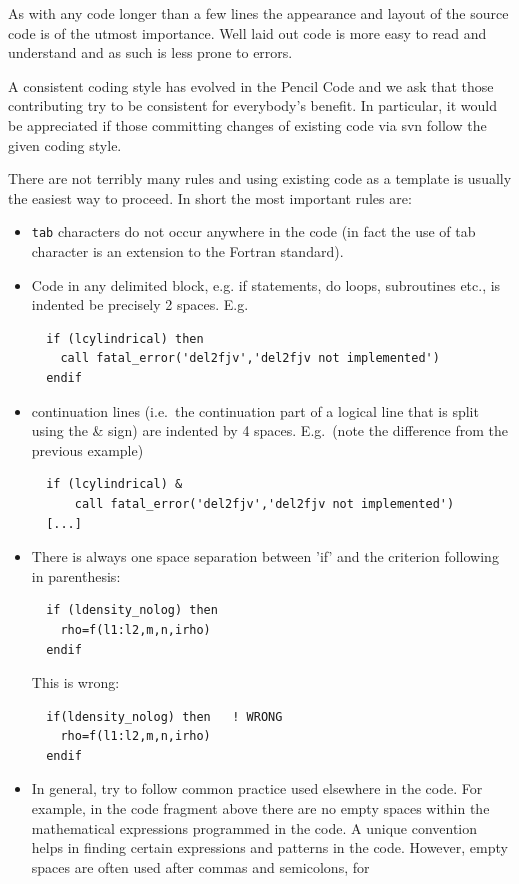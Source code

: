 \documentclass[\mydriver,12pt,twoside,notitlepage,a4paper]{article}
\makeatletter
\newcommand{\code}[1]{\texttt{#1}}
\newcommand{\cmd}{\command}
\newcommand{\command}[2][]{%
  \def\index@{#1}%
  \code{#2}%
  \ifx\index@\@empty\index{#2@\emph{#2}}%
  \else\index{#1@\emph{#1}}%
  \fi%
}
\makeatother
\begin{document}
As with any code longer than a few lines the appearance and layout
of the source code is of the utmost importance.  Well laid out
code is more easy to read and understand and as such is less prone
to errors.

A consistent coding style has evolved in the {\sc Pencil Code} and we
ask that those contributing try to be consistent for everybody's
benefit.  In particular, it would be appreciated if those committing
changes of existing code via svn follow the given coding style.

There are not terribly many rules and using existing code as a template
is usually the easiest way to proceed.  In short the most important rules are:
\begin{itemize}
\item \cmd{tab} characters do not occur anywhere in the code (in fact the use of
tab character is an extension to the Fortran standard).
\item Code in any delimited block, e.g. if statements, do loops, subroutines
etc., is indented be precisely 2 spaces.
E.g.
\begin{Verbatim}
  if (lcylindrical) then
    call fatal_error('del2fjv','del2fjv not implemented')
  endif
\end{Verbatim}
\item continuation lines (i.e.~the continuation part of a logical line
  that is split using the \& sign) are indented by 4 spaces.
  E.g.~(note the difference from the previous example)
\begin{Verbatim}
  if (lcylindrical) &
      call fatal_error('del2fjv','del2fjv not implemented')
  [...]
\end{Verbatim}
\item There is always one space separation between 'if' and the criterion
following in parenthesis:
\begin{verbatim}
  if (ldensity_nolog) then
    rho=f(l1:l2,m,n,irho)
  endif
\end{verbatim}
This is wrong:
\begin{verbatim}
  if(ldensity_nolog) then   ! WRONG
    rho=f(l1:l2,m,n,irho)
  endif
\end{verbatim}
\item
In general, try to follow common practice used elsewhere in the code.
For example, in the code fragment above there are no empty spaces within
the mathematical expressions programmed in the code.
A unique convention helps in finding certain expressions and patterns
in the code.
However, empty spaces are often used after commas and semicolons, for

\end{itemize}
\end{document}
